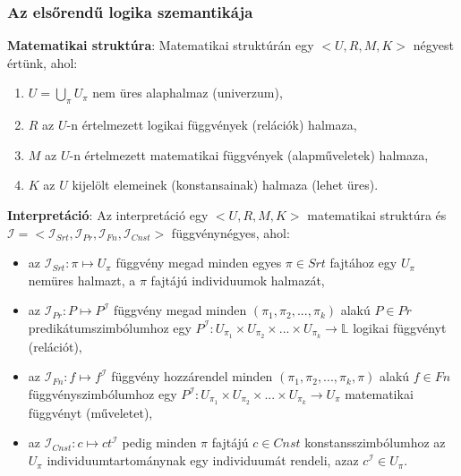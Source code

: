 \documentclass[margin=0px]{article}
\begin{document}
\subsubsection{Az elsőrendű logika szemantikája}

\noindent \textbf{Matematikai struktúra}: Matematikai struktúrán egy $<U, R, M, K>$ négyest értünk, ahol:

\begin{enumerate}
    \item	$U = \bigcup_{\pi} U_{\pi}$ nem üres alaphalmaz (univerzum),

    \item	$R$ az $U$-n értelmezett logikai függvények (relációk) halmaza,

    \item	$M$ az $U$-n értelmezett matematikai függvények (alapműveletek) halmaza,

    \item	$K$ az $U$ kijelölt elemeinek (konstansainak) halmaza (lehet üres).
\end{enumerate}

\noindent \textbf{Interpretáció}: Az interpretáció egy $<U, R, M, K>$ matematikai struktúra és
$\mathcal{I} = <\mathcal{I}_{Srt}, \mathcal{I}_{Pr}, \mathcal{I}_{Fn}, \mathcal{I}_{Cnst}>$
függvénynégyes, ahol:

\begin{itemize}
    \item	az $\mathcal{I}_{Srt} : \pi \mapsto U_{\pi}$ függvény megad minden egyes $\pi \in Srt$ fajtához
          egy $U_{\pi}$ nemüres halmazt, a $\pi$ fajtájú individuumok halmazát,

    \item	az $\mathcal{I}_{Pr} : P \mapsto P^{\mathcal{I}}$ függvény megad minden
          $(\pi_{1}, \pi_{2}, ..., \pi_{k})$ alakú $P \in Pr$ predikátumszimbólumhoz egy
          $P^{\mathcal{I}} : U_{\pi_{1}} \times U_{\pi_{2}} \times ... \times U_{\pi_{k}} \to \mathbb{L}$
          logikai függvényt (relációt),

    \item	az $\mathcal{I}_{Fn} : f \mapsto f^{\mathcal{I}}$ függvény hozzárendel minden
          $(\pi_{1}, \pi_{2}, ..., \pi_{k}, \pi)$ alakú $f \in Fn$ függvényszimbólumhoz egy
          $P^{\mathcal{I}} : U_{\pi_{1}} \times U_{\pi_{2}} \times ... \times U_{\pi_{k}} \to U_{\pi}$
          matematikai függvényt (műveletet),

    \item	az $\mathcal{I}_{Cnst} : c \mapsto ct^{\mathcal{I}}$ pedig minden $\pi$ fajtájú
          $c \in Cnst$ konstansszimbólumhoz az $U_{\pi}$ individuumtartománynak egy individuumát
          rendeli, azaz $c^{\mathcal{I}} \in U_{\pi}$.
\end{itemize}
\end{document}
